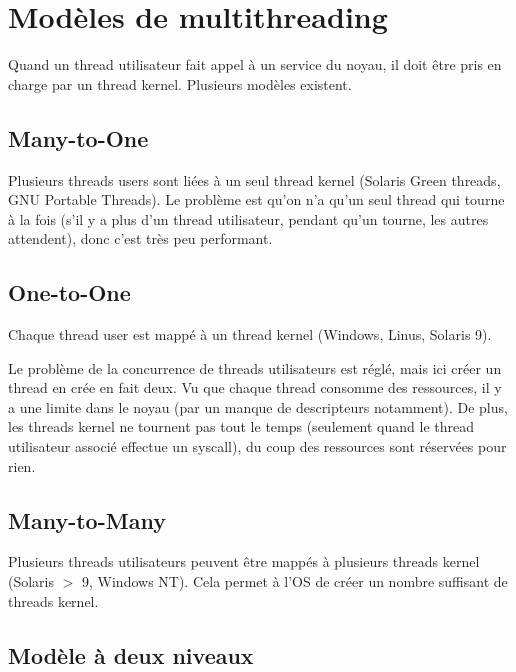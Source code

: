 \section{Modèles de multithreading}

	Quand un thread utilisateur fait appel à un service du noyau, il doit être pris en charge par un thread kernel. Plusieurs modèles existent.

	\subsection{Many-to-One}
	
	Plusieurs threads users sont liées à un seul thread kernel (Solaris Green threads, GNU Portable Threads). Le problème est qu'on n'a qu'un seul thread qui tourne à la fois (s'il y a plus d'un thread utilisateur, pendant qu'un tourne, les autres attendent), donc c'est très peu performant.

	
	\subsection{One-to-One}
	
	Chaque thread user est mappé à un thread kernel (Windows, Linus, Solaris 9).
	
	
	Le problème de la concurrence de threads utilisateurs est réglé, mais ici créer un thread en crée en fait deux. Vu que chaque thread consomme des ressources, il y a une limite dans le noyau (par un manque de descripteurs notamment). De plus, les threads kernel ne tournent pas tout le temps (seulement quand le thread utilisateur associé effectue un syscall), du coup des ressources sont réservées pour rien.
	
	\subsection{Many-to-Many}
	
	Plusieurs threads utilisateurs peuvent être mappés à plusieurs threads kernel (Solaris $>$ 9, Windows NT). Cela permet à l'OS de créer un nombre suffisant de threads kernel.
	
	
	\subsection{Modèle à deux niveaux}
	
